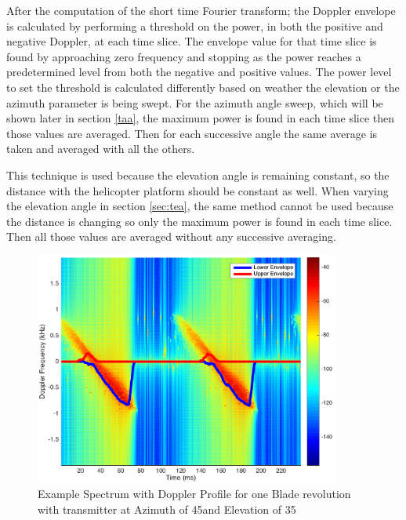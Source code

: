 After the computation of the short time Fourier transform; the Doppler envelope is calculated by performing a threshold on the power, in both the positive and negative Doppler, at each time slice. The envelope value for that time slice is found by approaching zero frequency and stopping as the power reaches a predetermined level from both the negative and positive values. The power level to set the threshold is calculated differently based on weather the elevation or the azimuth parameter is being swept. For the azimuth angle sweep, which will be shown later in section \ref{taa}, the maximum power is found in each time slice then those values are averaged. Then for each successive angle the same average is taken and averaged with all the others. 


This technique is used because the elevation angle is remaining constant, so the distance with the helicopter platform should be constant as well. When varying the elevation angle in section \ref{sec:tea}, the same method cannot be used because the distance is changing so only the maximum power is found in each time slice. Then all those values are averaged without any successive averaging.

\begin{figure}
	\begin{center}
		\includegraphics[width=10cm]{images/simulation/test_analysis_spectrogram_with_envelope.eps}
		\caption{Example Spectrum with Doppler Profile for one Blade revolution with transmitter at Azimuth of 45\textdegree \space and Elevation of 35\textdegree}
		\label{fig:test_spec_w_doppler_profile}
	\end{center}
\end{figure}

